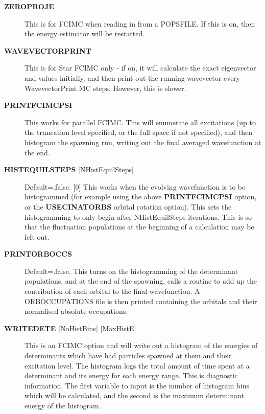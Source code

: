 \documentclass[openany,a4paper,10pt,english]{manual}
\begin{document}
\begin{description}
\item[\textbf{ZEROPROJE}] \leavevmode
This is for FCIMC when reading in from a POPSFILE. If this is on, then the energy
estimator will be restarted.

\item[\textbf{WAVEVECTORPRINT}] \leavevmode
This is for Star FCIMC only - if on, it will calculate the exact eigenvector and
values initially, and then print out the running wavevector every
WavevectorPrint MC steps. However, this is slower.

\item[\textbf{PRINTFCIMCPSI}] \leavevmode
This works for parallel FCIMC. This will enumerate all excitations (up to the truncation level specified,
or the full space if not specified), and then histogram the spawning run, writing out the final
averaged wavefunction at the end.

\item[\textbf{HISTEQUILSTEPS} {[}NHistEquilSteps{]}] \leavevmode
Default=.false. {[}0{]}
This works when the evolving wavefunction is to be histogrammed (for example using the above
\textbf{PRINTFCIMCPSI} option, or the \textbf{USECINATORBS} orbital rotation option).
This sets the histogramming to only begin after NHistEquilSteps iterations.  This is so that the
fluctuation populations at the beginning of a calculation may be left out.

\item[\textbf{PRINTORBOCCS}] \leavevmode
Default=.false.
This turns on the histogramming of the determinant populations, and at the end of the spawning, calls a
routine to add up the contribution of each orbital to the final wavefunction.  A ORBOCCUPATIONS file is then
printed containing the orbitals and their normalised absolute occupations.

\item[\textbf{WRITEDETE} {[}NoHistBins{]} {[}MaxHistE{]}] \leavevmode
This is an FCIMC option and will write out a histogram of the energies of determinants which have
had particles spawned at them and their excitation level. The histogram logs the total
amount of time spent at a determinant and its energy for each energy range. This is diagnostic
information. The first variable to input is the number of histogram bins which will be calculated,
and the second is the maximum determinant energy of the histogram.


\end{description}
\end{document}
